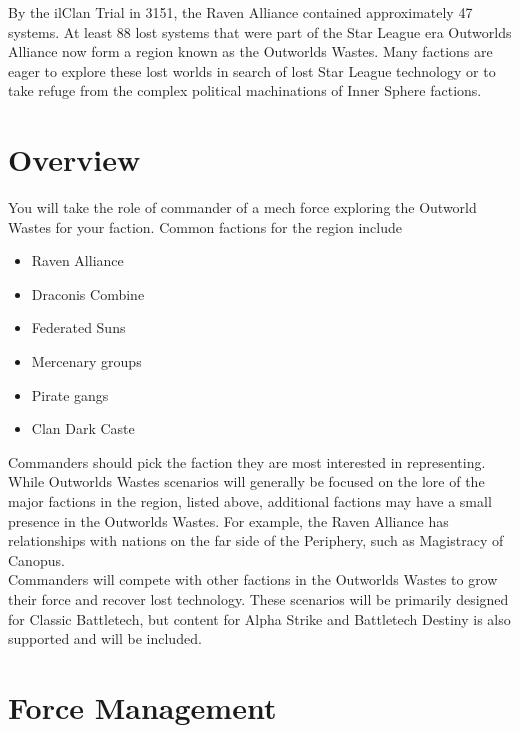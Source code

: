 \documentclass[UTF8]{article}
\begin{document}
By the ilClan Trial in 3151, the Raven Alliance contained approximately 47 systems.
At least 88 lost systems that were part of the Star League era Outworlds Alliance now form a region known as the Outworlds Wastes.
Many factions are eager to explore these lost worlds in search of lost Star League technology or to take refuge from the complex political machinations of Inner Sphere factions.\\

\section{Overview}

You will take the role of commander of a mech force exploring the Outworld Wastes for your faction.
Common factions for the region include

\begin{itemize}

\item Raven Alliance

\item Draconis Combine

\item Federated Suns

\item Mercenary groups

\item Pirate gangs

\item Clan Dark Caste

\end{itemize}

Commanders should pick the faction they are most interested in representing.
While Outworlds Wastes scenarios will generally be focused on the lore of the major factions in the region, listed above, additional factions may have a small presence in the Outworlds Wastes.
For example, the Raven Alliance has relationships with nations on the far side of the Periphery, such as Magistracy of Canopus.\\

Commanders will compete with other factions in the Outworlds Wastes to grow their force and recover lost technology.
These scenarios will be primarily designed for Classic Battletech, but content for Alpha Strike and Battletech Destiny is also supported and will be included.

\newpage

\section{Force Management}
\end{document}
